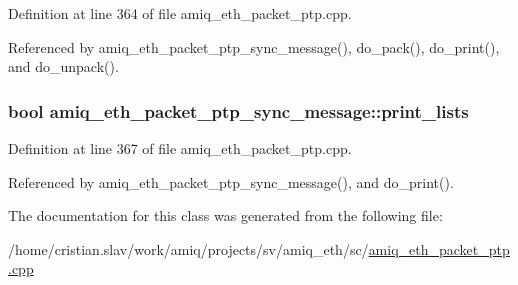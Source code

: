 Definition at line 364 of file amiq\_\-eth\_\-packet\_\-ptp.cpp.

Referenced by amiq\_\-eth\_\-packet\_\-ptp\_\-sync\_\-message(), do\_\-pack(), do\_\-print(), and do\_\-unpack().\hypertarget{classamiq__eth__packet__ptp__sync__message_ae7f8f44c6b98c23c6f826bbc29e7598c}{
\subsubsection[{print\_\-lists}]{\setlength{\rightskip}{0pt plus 5cm}bool {\bf amiq\_\-eth\_\-packet\_\-ptp\_\-sync\_\-message::print\_\-lists}}}
\label{classamiq__eth__packet__ptp__sync__message_ae7f8f44c6b98c23c6f826bbc29e7598c}


Definition at line 367 of file amiq\_\-eth\_\-packet\_\-ptp.cpp.

Referenced by amiq\_\-eth\_\-packet\_\-ptp\_\-sync\_\-message(), and do\_\-print().

The documentation for this class was generated from the following file:\begin{DoxyCompactItemize}
\item 
/home/cristian.slav/work/amiq/projects/sv/amiq\_\-eth/sc/\hyperlink{amiq__eth__packet__ptp_8cpp}{amiq\_\-eth\_\-packet\_\-ptp.cpp}\end{DoxyCompactItemize}
